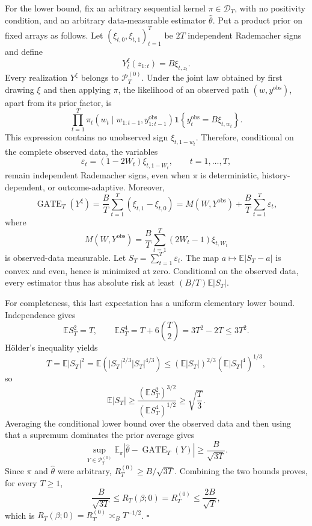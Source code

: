 For the lower bound, fix an arbitrary sequential kernel \(\pi\in\mathcal D_T\), with no positivity condition, and an arbitrary data-measurable estimator \(\widehat\theta\). Put a product prior on fixed arrays as follows. Let \((\xi_{t,0},\xi_{t,1})_{t=1}^T\) be \(2T\) independent Rademacher signs and define
\[
Y_t^{\xi}(z_{1:t})=B\xi_{t,z_t}.
\]
Every realization \(Y^\xi\) belongs to \(\mathcal P_T^{(0)}\). Under the joint law obtained by first drawing \(\xi\) and then applying \(\pi\), the likelihood of an observed path \((w,y^{\mathrm{obs}})\), apart from its prior factor, is
\[
\prod_{t=1}^T
\pi_t\!\left(w_t\mid w_{1:t-1},y_{1:t-1}^{\mathrm{obs}}\right)
\mathbf 1\!\left\{y_t^{\mathrm{obs}}=B\xi_{t,w_t}\right\}.
\]
This expression contains no unobserved sign \(\xi_{t,1-w_t}\). Therefore, conditional on the complete observed data, the variables
\[
\varepsilon_t=(1-2W_t)\xi_{t,1-W_t},\qquad t=1,\ldots,T,
\]
remain independent Rademacher signs, even when \(\pi\) is deterministic, history-dependent, or outcome-adaptive. Moreover,
\[
\operatorname{GATE}_T(Y^\xi)
=\frac BT\sum_{t=1}^T(\xi_{t,1}-\xi_{t,0})
=M(W,Y^{\mathrm{obs}})+\frac BT\sum_{t=1}^T\varepsilon_t,
\]
where
\[
M(W,Y^{\mathrm{obs}})=\frac BT\sum_{t=1}^T(2W_t-1)\xi_{t,W_t}
\]
is observed-data measurable. Let \(S_T=\sum_{t=1}^T\varepsilon_t\). The map \(a\mapsto\mathbb E|S_T-a|\) is convex and even, hence is minimized at zero. Conditional on the observed data, every estimator thus has absolute risk at least \((B/T)\mathbb E|S_T|\).

For completeness, this last expectation has a uniform elementary lower bound. Independence gives
\[
\mathbb E S_T^2=T,
\qquad
\mathbb E S_T^4=T+6\binom T2=3T^2-2T\le 3T^2.
\]
Hölder's inequality yields
\[
T=\mathbb E|S_T|^2
=\mathbb E\!\left(|S_T|^{2/3}|S_T|^{4/3}\right)
\le (\mathbb E|S_T|)^{2/3}(\mathbb E|S_T|^4)^{1/3},
\]
so
\[
\mathbb E|S_T|\ge
\frac{(\mathbb E S_T^2)^{3/2}}{(\mathbb E S_T^4)^{1/2}}
\ge \sqrt{\frac T3}.
\]
Averaging the conditional lower bound over the observed data and then using that a supremum dominates the prior average gives
\[
\sup_{Y\in\mathcal P_T^{(0)}}
\mathbb E_\pi\left|\widehat\theta-\operatorname{GATE}_T(Y)\right|
\ge \frac{B}{\sqrt{3T}}.
\]
Since \(\pi\) and \(\widehat\theta\) were arbitrary, \(R_T^{(0)}\ge B/\sqrt{3T}\). Combining the two bounds proves, for every \(T\ge1\),
\[
\frac{B}{\sqrt{3T}}
\le R_T(\beta;0)=R_T^{(0)}
\le \frac{2B}{\sqrt T},
\]
which is \(R_T(\beta;0)=R_T^{(0)}\asymp_B T^{-1/2}\). \(\square\)